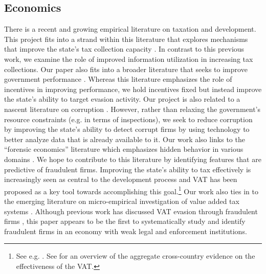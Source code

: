 \subsection{Economics}
\label{subsec:literature-economics}
There is a recent and growing empirical literature on taxation and development. This project fits into a strand within this literature
that explores mechanisms that improve the state's tax collection capacity \citep{khan2016tax}. In contrast to this previous work, we examine the role of improved information utilization in increasing tax collections. Our paper also fits into a broader literature that seeks to improve government performance \citep{muralidharan2011teacher, glewwe2010teacher}. Whereas this literature emphasizes the role of incentives in improving performance, we hold incentives fixed but instead improve the state's ability to target evasion activity. Our project is also related to a nascent literature on corruption \citep{olken2012corruption, duflo2013truth}. However, rather than relaxing the government's resource constraints (e.g. in terms of inspections), we seek to reduce corruption by improving the state's ability to detect corrupt firms by using technology to better analyze data that is already available to it. Our work also links to the ``forensic economics'' literature which emphasizes hidden behavior in various domains \citep{zitzewitz2012forensic, jacob2003rotten, mironov2014corruption}. We hope to contribute to this literature by identifying features that are predictive of fraudulent firms. Improving the state's ability to tax effectively is increasingly seen as central to the development process and VAT has been proposed as a key tool towards accomplishing this goal.\footnote{See e.g. \cite{besley2013taxation}. See  \cite{Ebrilletal:2001} for an overview of the aggregate cross-country evidence on the effectiveness of the VAT.} Our work also ties in to the emerging literature on micro-empirical investigation of value added tax systems \citep{almunia2018under, mittal2017vat, naritomi2013consumers, pomeranz2015no}.  Although previous work has discussed VAT evasion through fraudulent firms \citep{keen2006vat, pashev2007countering}, this paper appears to be the first to systematically study and identify fraudulent firms in an economy with weak legal and enforcement institutions.

